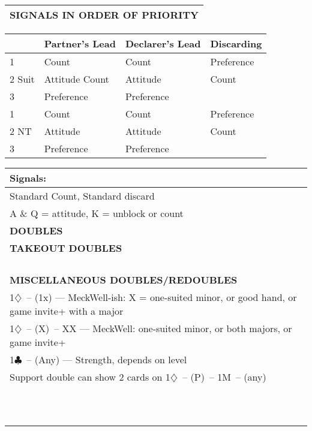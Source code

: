 \documentclass{article}
\newcommand\C{\ensuremath{\clubsuit}}
\newcommand\D{\ensuremath{\diamondsuit}}
\begin{document}
\begin{minipage}{90mm}
\begin{tabular}{| p{88mm} |}
		\textbf{SIGNALS IN ORDER OF PRIORITY} \\ \hline
	\end{tabular}
	\begin{tabular}{| p{8.9mm} | p{22mm} | p{22mm} | p{22mm} |}
		& Partner's Lead & Declarer's Lead & Discarding \\ \hline
		1 & Count & Count & Preference\\ \hline
		2 Suit & Attitude Count & Attitude & Count \\ \hline
		3 & Preference & Preference & \\ \hline
		1 & Count & Count & Preference\\ \hline
		2 NT & Attitude & Attitude & Count\\ \hline
		3 & Preference & Preference & \\ \hline
	\end{tabular}
	\begin{tabular}{| p{88mm} |}
		Signals: \\ \hline
		Standard Count, Standard discard\\ \hline
		A \& Q = attitude, K = unblock or count\\ \hline \hline
		\cellcolor[gray]{0.9} \textbf{DOUBLES} \\ \hline
		\textbf{TAKEOUT DOUBLES} \\ \hline
		\\ \hline
		\\ \hline
		\\ \hline
		\\ \hline
		\textbf{MISCELLANEOUS DOUBLES/REDOUBLES} \\ \hline
		1\D\ -- (1x) --- MeckWell-ish: X = one-suited minor, or good hand, or game invite+ with a major\\ \hline
		1\D\ -- (X)\ -- XX --- MeckWell: one-suited minor, or both majors, or game invite+\\ \hline
		1\C\ -- (Any) --- Strength, depends on level\\ \hline
		Support double can show 2 cards on 1\D\ -- (P)\ -- 1M\ -- (any)\\
				\\ \hline
						\\ \hline
		\\ \hline
		\\ \hline
		\\ \hline
		\\ \hline
		\\ \hline
		\\ \hline
		\\ \hline
		\\ \hline
		\\ \hline

	\end{tabular}
\end{minipage}
\end{document}
